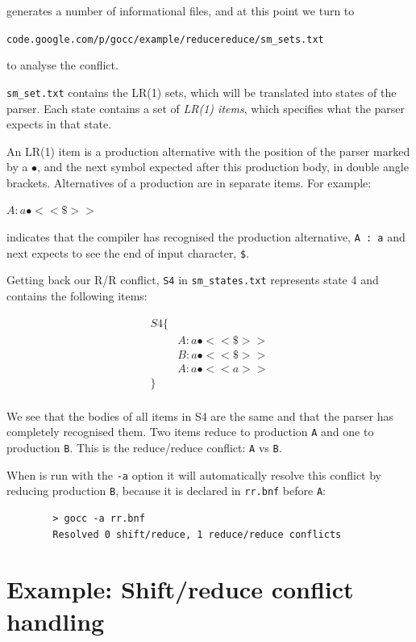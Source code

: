 \documentclass[12pt]{article}
\begin{document}
	\gocc generates a number of informational files, and at this point we turn to 

	\verb|code.google.com/p/gocc/example/reducereduce/sm_sets.txt|

	to analyse the conflict.

	\verb|sm_set.txt| contains the LR(1) sets, which will be translated into states of the parser. Each state contains a set of {\em LR(1)  items}, which specifies what the parser expects in that state. 

	An LR(1) item is a production alternative with the position of the parser marked by a $\bullet$, and the next symbol expected after this production body, in double angle brackets. Alternatives of a production are in  separate items. For example: 

	$A : a\bullet <<\$>>$

	indicates that the compiler has recognised the production alternative, \verb|A : a| and  next expects to see the end of input character, \verb|$|.

	Getting back our R/R conflict, \verb|S4|  in \verb|sm_states.txt| represents state 4 and contains the following items:

	\[
		\begin{array}{ll}
			S4 \{ \\
			    & A : a\bullet  <<\$>> \\
			    & B : a\bullet  <<\$>> \\
			    & A : a\bullet  <<a>> \\
			\} \\
		\end{array}
	\]

	We see that the bodies of all items in S4 are the same and that the parser has completely recognised them. Two items reduce to production \verb|A| and one to production \verb|B|. This is the reduce/reduce conflict: \verb|A| vs \verb|B|.

	When \gocc is run with the \verb|-a| option it will automatically resolve this conflict by reducing production \verb|B|, because it is declared in \verb|rr.bnf| before \verb|A|:

	\begin{verbatim}
		> gocc -a rr.bnf
		Resolved 0 shift/reduce, 1 reduce/reduce conflicts
	\end{verbatim}

\section{Example: Shift/reduce conflict handling}
\TBD
\end{document}

